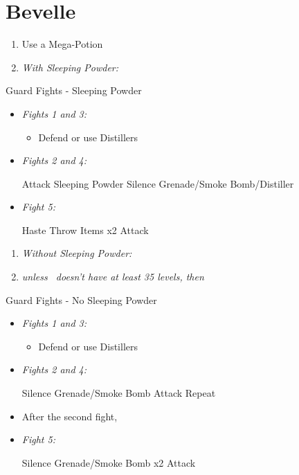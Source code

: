 \chapter{Bevelle}
\begin{enumerate}
	\item Use a Mega-Potion
	\item \textit{With Sleeping Powder:}
\end{enumerate}
\begin{battle}{Guard Fights - Sleeping Powder}
\begin{itemize}
	\item \textit{Fights 1 and 3:}
	\begin{itemize}
		\tidusf Attack
		\item Defend or use Distillers
	\end{itemize}
	\item \textit{Fights 2 and 4:}
	\begin{itemize}
		\tidusf Attack
		\rikkuf Sleeping Powder
		\kimahrif Silence Grenade/Smoke Bomb/Distiller
	\end{itemize}
	\item \textit{Fight 5:}
	\begin{itemize}
		\tidusf Haste \rikku
		\rikkuf Throw Items x2
		\tidusf Attack
	\end{itemize}
\end{itemize}
\end{battle}
\begin{enumerate}[resume]
	\item \textit{Without Sleeping Powder:}
	\item \formation{\tidus}{\rikku}{\auron} \textit{unless \lulu\ doesn't have at least 35 levels, then } \formation{\tidus}{\rikku}{\lulu}
\end{enumerate}
\begin{battle}{Guard Fights - No Sleeping Powder}
\begin{itemize}
	\item \textit{Fights 1 and 3:}
	\begin{itemize}
		\tidusf Attack
		\item Defend or use Distillers
	\end{itemize}
	\item \textit{Fights 2 and 4:}
	\begin{itemize}
		\switch{\tidus}{\kimahri}
		\kimahrif Silence Grenade/Smoke Bomb
		\switch{\rikku}{\tidus}
		\tidusf Attack
		\kimahrif Repeat
	\end{itemize}
	\item After the second fight, \formation{\tidus}{\rikku}{\lulu}
	\item \textit{Fight 5:}
	\begin{itemize}
		\switch{\tidus}{\rikku}
		\rikkuf Silence Grenade/Smoke Bomb x2
		\switch{\kimahri}{\tidus}
		\tidusf Attack
	\end{itemize}
\end{itemize}
\end{battle}
